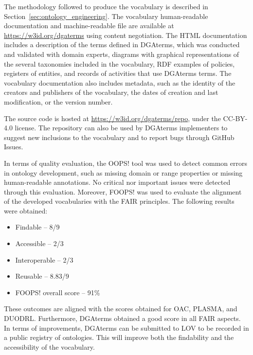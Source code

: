 The methodology followed to produce the vocabulary is described in Section~\ref{sec:ontology_engineering}.
The vocabulary human-readable documentation and machine-readable file are available at \url{https://w3id.org/dgaterms} using content negotiation.
The HTML documentation includes a description of the terms defined in DGAterms, which was conducted and validated with domain experts, diagrams with graphical representations of the several taxonomies included in the vocabulary, RDF examples of policies, registers of entities, and records of activities that use DGAterms terms.
The vocabulary documentation also includes metadata, such as the identity of the creators and publishers of the vocabulary, the dates of creation and last modification, or the version number.

The source code is hosted at \url{https://w3id.org/dgaterms/repo}, under the CC-BY-4.0 license.
The repository can also be used by DGAterms implementers to suggest new inclusions to the vocabulary and to report bugs through GitHub Issues.

In terms of quality evaluation, the OOPS! tool was used to detect common errors in ontology development, such as missing domain or range properties or missing human-readable annotations.
No critical nor important issues were detected through this evaluation.
Moreover, FOOPS! was used to evaluate the alignment of the developed vocabularies with the FAIR principles.
The following results were obtained:
\begin{itemize}
    \item Findable -- 8/9
    \item Accessible -- 2/3
    \item Interoperable -- 2/3
    \item Reusable -- 8.83/9
    \item FOOPS! overall score -- 91\%
\end{itemize}
These outcomes are aligned with the scores obtained for OAC, PLASMA, and DUODRL.
Furthermore, DGAterms obtained a good score in all FAIR aspects.
In terms of improvements, DGAterms can be submitted to LOV to be recorded in a public registry of ontologies.
This will improve both the findability and the accessibility of the vocabulary.
